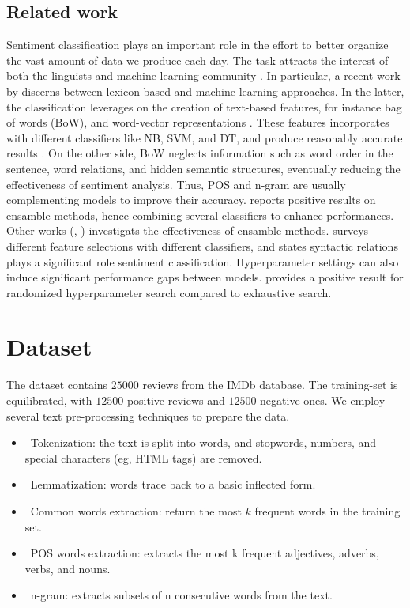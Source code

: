 \documentclass[twoside,twocolumn]{article}
\begin{document}
\subsection{Related work}
Sentiment classification plays an important role in the effort to better organize the vast amount of data we produce each day. The task attracts the interest of both the linguists and machine-learning community \citep{pang2002thumbs}. In particular, a recent work by \cite{Medhat2014ensemble} discerns between lexicon-based and machine-learning approaches. In the latter, the classification leverages on the creation of text-based features, for instance bag of words (BoW), and word-vector representations \citep{mikolov2013exploiting}. These features incorporates with different classifiers like NB, SVM, and DT, and produce reasonably accurate results \citep{pang2002thumbs}. On the other side, BoW neglects information such as word order in the sentence, word relations, and hidden semantic structures, eventually reducing the effectiveness of sentiment analysis. Thus, POS and n-gram are usually complementing models to improve their accuracy. \citep{al2017automatic} reports positive results on ensamble methods, hence combining several classifiers to enhance performances. Other works (\cite{Cata2017ensemble}, \cite{Chalothom2015ensemble}) investigats the effectiveness of ensamble methods. \cite{xia2011ensemble} surveys different feature selections with different classifiers, and states syntactic relations plays a significant role sentiment classification. 
Hyperparameter settings can also induce significant performance gaps between models. \citep{bergstra2012random} provides a positive result for randomized hyperparameter search compared to exhaustive search.



\section{Dataset}
\label{sec:dataset}
The dataset contains $25000$ reviews from the IMDb database. The training-set is equilibrated, with $12500$ positive reviews and $12500$ negative ones. We employ several text pre-processing techniques to prepare the data.
\begin{itemize}
    \item \ Tokenization: the text is split into words, and stopwords, numbers, and special characters (eg, HTML tags) are removed.
    \item \ Lemmatization: words trace back to a basic inflected form.
    \item \ Common words extraction: return the most $k$ frequent words in the training set.
    \item \ POS words extraction: extracts the most k frequent adjectives, adverbs, verbs, and nouns.
    \item \ n-gram: extracts subsets of n consecutive words from the text.
\end{itemize}
\end{document}
